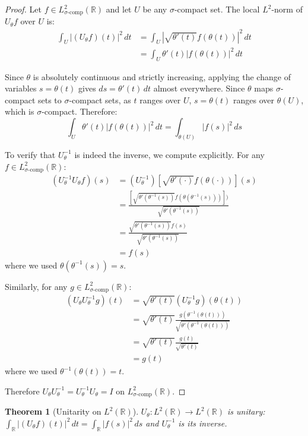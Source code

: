 \documentclass{article}
\newtheorem{theorem}{Theorem}[section]
\begin{document}
\begin{proof}
Let $f\in L^2_{\sigma\text{-comp}}(\mathbb{R})$ and let $U$ be any $\sigma$-compact set. The local $L^2$-norm of $U_\theta f$ over $U$ is:
\begin{align}
\int_U |(U_\theta f)(t)|^2\,dt &= \int_U \left|\sqrt{\theta'(t)}f(\theta(t))\right|^2\,dt\\
&= \int_U \theta'(t)|f(\theta(t))|^2\,dt
\end{align}

Since $\theta$ is absolutely continuous and strictly increasing, applying the change of variables $s=\theta(t)$ gives $ds=\theta'(t)\,dt$ almost everywhere. Since $\theta$ maps $\sigma$-compact sets to $\sigma$-compact sets, as $t$ ranges over $U$, $s=\theta(t)$ ranges over $\theta(U)$, which is $\sigma$-compact. Therefore:
\[
\int_U \theta'(t)|f(\theta(t))|^2\,dt = \int_{\theta(U)} |f(s)|^2\,ds
\]

To verify that $U_\theta^{-1}$ is indeed the inverse, we compute explicitly. For any $f\in L^2_{\sigma\text{-comp}}(\mathbb{R})$:
\begin{align}
(U_\theta^{-1} U_\theta f)(s) &= (U_\theta^{-1})[\sqrt{\theta'(\cdot)}f(\theta(\cdot))](s)\\
&= \frac{[\sqrt{\theta'(\theta^{-1}(s))}f(\theta(\theta^{-1}(s)))])}{\sqrt{\theta'(\theta^{-1}(s))}}\\
&= \frac{\sqrt{\theta'(\theta^{-1}(s))}f(s)}{\sqrt{\theta'(\theta^{-1}(s))}}\\
&= f(s)
\end{align}
where we used $\theta(\theta^{-1}(s))=s$.

Similarly, for any $g\in L^2_{\sigma\text{-comp}}(\mathbb{R})$:
\begin{align}
(U_\theta U_\theta^{-1}g)(t) &= \sqrt{\theta'(t)}(U_\theta^{-1}g)(\theta(t))\\
&= \sqrt{\theta'(t)}\frac{g(\theta^{-1}(\theta(t)))}{\sqrt{\theta'(\theta^{-1}(\theta(t)))}}\\
&= \sqrt{\theta'(t)}\frac{g(t)}{\sqrt{\theta'(t)}}\\
&= g(t)
\end{align}
where we used $\theta^{-1}(\theta(t))=t$.

Therefore $U_\theta U_\theta^{-1} = U_\theta^{-1} U_\theta = I$ on $L^2_{\sigma\text{-comp}}(\mathbb{R})$.
\end{proof}

\begin{theorem}[Unitarity on $L^2(\mathbb{R})$]\label{thm:global_unitarity}
$U_\theta:L^2(\mathbb{R})\to L^2(\mathbb{R})$ is unitary: $\int_{\mathbb{R}} |(U_\theta f)(t)|^2\,dt=\int_{\mathbb{R}} |f(s)|^2\,ds$ and $U_\theta^{-1}$ is its inverse.
\end{theorem}
\end{document}
